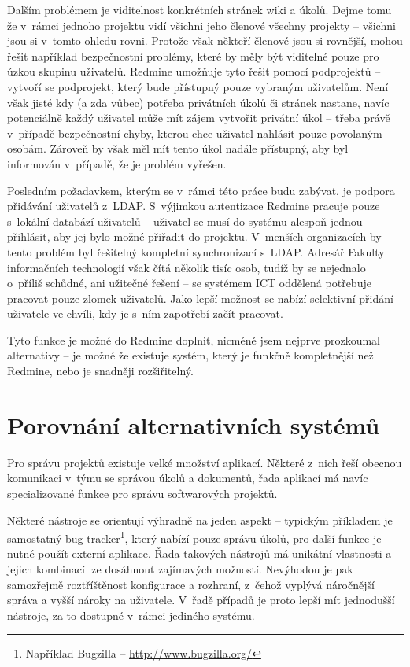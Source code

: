 \documentclass[thesis=B,czech]{FITthesis}[2012/05/02]
\begin{document}
Dalším problémem je viditelnost konkrétních stránek wiki a úkolů. Dejme
tomu že v~rámci jednoho projektu vidí všichni jeho členové všechny
projekty -- všichni jsou si v~tomto ohledu rovni. Protože však někteří
členové jsou si rovnější, mohou řešit například bezpečnostní problémy,
které by měly být viditelné pouze pro úzkou skupinu uživatelů. Redmine
umožňuje tyto  řešit pomocí podprojektů --
vytvoří se podprojekt, který bude přístupný pouze vybraným uživatelům.
Není však jisté kdy (a zda vůbec) potřeba privátních úkolů či stránek
nastane, navíc potenciálně každý uživatel může mít zájem vytvořit
privátní úkol -- třeba právě v~případě bezpečnostní chyby, kterou chce
uživatel nahlásit pouze povolaným osobám. Zároveň by však měl mít tento
úkol nadále přístupný, aby byl informován v~případě, že je problém
vyřešen.

Posledním požadavkem, kterým se v~rámci této práce budu zabývat, je
podpora přidávání uživatelů z~\gls{LDAP}. S~výjimkou autentizace Redmine
pracuje pouze s~lokální databází uživatelů -- uživatel se musí do
systému alespoň jednou přihlásit, aby jej bylo možné přiřadit do
projektu. V~menších organizacích by tento problém byl řešitelný
kompletní synchronizací s~\gls{LDAP}. Adresář Fakulty informačních
technologií však čítá několik tisíc osob, tudíž by se nejednalo o~příliš
schůdné, ani užitečné řešení -- se systémem ICT oddělená potřebuje
pracovat pouze zlomek uživatelů. Jako lepší možnost se nabízí selektivní
přidání uživatele ve chvíli, kdy je s~ním zapotřebí začít pracovat.

Tyto funkce je možné do Redmine doplnit, nicméně jsem nejprve prozkoumal
alternativy -- je možné že existuje systém, který je funkčně
kompletnější než Redmine, nebo je snadněji rozšiřitelný.

\chapter{Porovnání alternativních systémů}

Pro správu projektů existuje velké množství aplikací. Některé z~nich
řeší obecnou komunikaci v~týmu se správou úkolů a dokumentů, řada
aplikací má navíc specializované funkce pro správu softwarových
projektů.

Některé nástroje se orientují výhradně na jeden aspekt -- typickým
příkladem je samostatný \gls{bug tracker}\footnote{Například Bugzilla --
  \url{http://www.bugzilla.org/}}, který nabízí pouze správu úkolů, pro
další funkce je nutné použít externí aplikace. Řada takových nástrojů má
unikátní vlastnosti a jejich kombinací lze dosáhnout zajímavých
možností. Nevýhodou je pak samozřejmě roztříštěnost konfigurace a
rozhraní, z~čehož vyplývá náročnější správa a vyšší nároky na uživatele.
V~řadě případů je proto lepší mít jednodušší nástroje, za to dostupné
v~rámci jediného systému.
\end{document}
